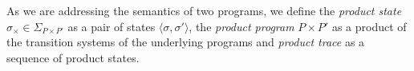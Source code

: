 As we are addressing the semantics of two programs, we define the \emph{product state} $\sigma_{\times} \in \Sigma_{P \times P'}$ as a pair of states $\langle \sigma,\sigma' \rangle$, the \emph{product program} $P \times P'$ as a product of the transition systems of the underlying programs and \emph{product trace} as a sequence of product states.

